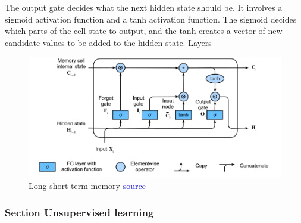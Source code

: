 \begin{itemize}
\begin{itemize}
    The output gate decides what the next hidden state should be. It involves a sigmoid activation function and a tanh activation function. The sigmoid decides which parts of the cell state to output, and the tanh creates a vector of new candidate values to be added to the hidden state.
    \href{https://ml-cheatsheet.readthedocs.io/en/latest/layers.html#lstm}{Layers}
    \begin{figure}[H]
        \centering
        \includegraphics[width=0.8\linewidth]{tex/img/LSTM_layer.PNG}
        \caption{Long short-term memory \protect\href{https://link.springer.com/article/10.1007/s10586-022-03707-y/figures/6}{\textcolor{blue}{source}}}
        \label{fig:LSTM_layer}
    \end{figure}
    \end{itemize}

\end{itemize}

\subsubsection{Section Unsupervised learning}

